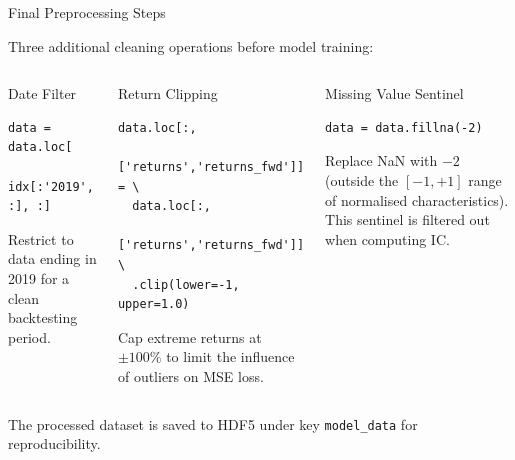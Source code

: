 \documentclass[aspectratio=169, 11pt]{beamer}
\begin{document}
\begin{frame}[fragile]{Final Preprocessing Steps}

Three additional cleaning operations before model training:

\vspace{0.3cm}

\begin{columns}[T]
\begin{block}{Date Filter}
\begin{lstlisting}
data = data.loc[
    idx[:'2019', :], :]
\end{lstlisting}
Restrict to data ending in 2019 for a clean backtesting period.
\end{block}

\begin{block}{Return Clipping}
\begin{lstlisting}
data.loc[:,
  ['returns','returns_fwd']] = \
  data.loc[:,
  ['returns','returns_fwd']] \
  .clip(lower=-1, upper=1.0)
\end{lstlisting}
Cap extreme returns at $\pm100\%$ to limit the influence of outliers on MSE loss.
\end{block}

\begin{block}{Missing Value Sentinel}
\begin{lstlisting}
data = data.fillna(-2)
\end{lstlisting}
Replace NaN with $-2$ (outside the $[-1,+1]$ range of normalised characteristics). This sentinel is filtered out when computing IC.
\end{block}
\end{columns}

\vspace{0.4cm}

The processed dataset is saved to HDF5 under key \texttt{model\_data} for reproducibility.

\end{frame}
%
%
\end{document}
